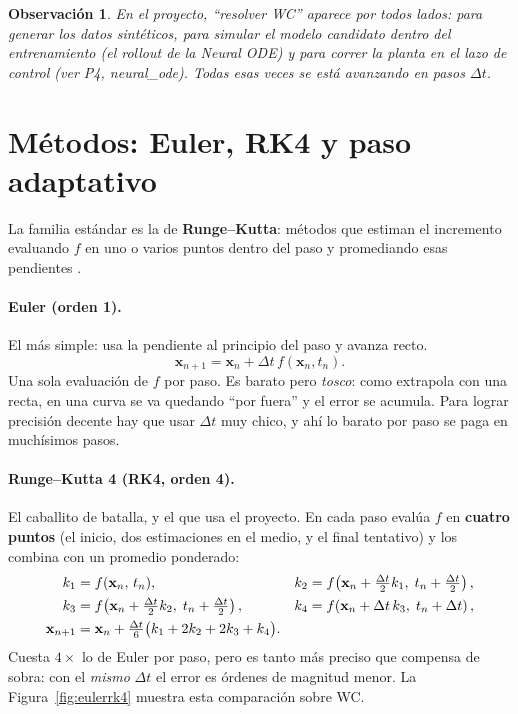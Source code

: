 \documentclass[11pt,a4paper]{article}
\newtheorem{remark}{Observación}
\begin{document}
\begin{remark}
En el proyecto, ``resolver WC'' aparece por todos lados: para \emph{generar} los datos sintéticos, para \emph{simular} el modelo candidato dentro del entrenamiento (el \emph{rollout} de la Neural ODE) y para \emph{correr la planta} en el lazo de control (ver P4, neural\_ode). Todas esas veces se está avanzando en pasos $\Delta t$.
\end{remark}

\section{Métodos: Euler, RK4 y paso adaptativo}
\label{sec:metodos}
La familia estándar es la de \textbf{Runge--Kutta}: métodos que estiman el incremento evaluando $f$ en uno o varios puntos dentro del paso y promediando esas pendientes \cite{hairer1993}.

\paragraph{Euler (orden 1).} El más simple: usa la pendiente al principio del paso y avanza recto.
\begin{equation}
  \mathbf{x}_{n+1}=\mathbf{x}_n+\Delta t\,f(\mathbf{x}_n,t_n).
\end{equation}
Una sola evaluación de $f$ por paso. Es barato pero \emph{tosco}: como extrapola con una recta, en una curva se va quedando ``por fuera'' y el error se acumula. Para lograr precisión decente hay que usar $\Delta t$ muy chico, y ahí lo barato por paso se paga en muchísimos pasos.

\paragraph{Runge--Kutta 4 (RK4, orden 4).} El caballito de batalla, y el que usa el proyecto. En cada paso evalúa $f$ en \textbf{cuatro puntos} (el inicio, dos estimaciones en el medio, y el final tentativo) y los combina con un promedio ponderado:
\begin{align}
  k_1 &= f(\mathbf{x}_n,\,t_n), &
  k_2 &= f\!\left(\mathbf{x}_n+\tfrac{\Delta t}{2}k_1,\;t_n+\tfrac{\Delta t}{2}\right),\notag\\
  k_3 &= f\!\left(\mathbf{x}_n+\tfrac{\Delta t}{2}k_2,\;t_n+\tfrac{\Delta t}{2}\right), &
  k_4 &= f\!\left(\mathbf{x}_n+\Delta t\,k_3,\;t_n+\Delta t\right),\notag\\
  \mathbf{x}_{n+1} &= \mathbf{x}_n+\tfrac{\Delta t}{6}\big(k_1+2k_2+2k_3+k_4\big).&&
  \label{eq:rk4}
\end{align}
Cuesta $4\times$ lo de Euler por paso, pero es tanto más preciso que compensa de sobra: con el \emph{mismo} $\Delta t$ el error es órdenes de magnitud menor. La Figura~\ref{fig:eulerrk4} muestra esta comparación sobre WC.
\end{document}
